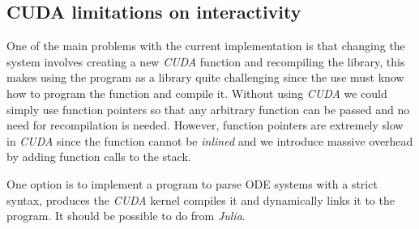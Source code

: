 \subsection{CUDA limitations on interactivity}

One of the main problems with the current implementation is that changing the system
involves creating a new \emph{CUDA} function and recompiling the library, this makes
using the program as a library quite challenging since the use must know how to
program the function and compile it. Without using \emph{CUDA} we could simply
use function pointers so that any arbitrary function can be passed and no need
for recompilation is needed. However, function pointers are extremely slow in \emph{CUDA}
since the function cannot be \emph{inlined} and we introduce massive overhead by
adding function calls to the stack.

One option is to implement a program to parse ODE systems with a strict syntax,
produces the \emph{CUDA} kernel compiles it and dynamically links it to the
program. It should be possible to do from \emph{Julia}.
